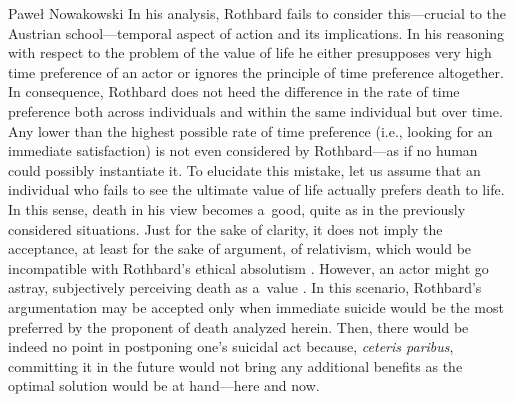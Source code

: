 \begin{artengenv}{Paweł Nowakowski}
In his analysis, Rothbard fails to consider this---crucial to the Austrian school---temporal aspect of action and its implications. In his reasoning with respect to the problem of the value of life he either presupposes very high time preference of an actor or ignores the principle of time preference altogether. In consequence, Rothbard does not heed the difference in the rate of time preference both across individuals and within the same individual but over time. Any lower than the highest possible rate of time preference (i.e., looking for an immediate satisfaction) is not even considered by Rothbard---as if no human could possibly instantiate it. To elucidate this mistake, let us assume that an individual who fails to see the ultimate value of life actually prefers death to life. In this sense, death in his view becomes a~good, quite as in the previously considered situations. Just for the sake of clarity, it does not imply the acceptance, at least for the sake of argument, of relativism, which would be incompatible with Rothbard's ethical absolutism 
\parencite[see][]{Rothbard2008Toward}. %
 However, an actor might go astray, subjectively perceiving death as a~value 
\parencite[cf.][p.252]{Nozick1971On}. %
 In this scenario, Rothbard's argumentation may be accepted only when immediate suicide would be the most preferred by the proponent of death analyzed herein. Then, there would be indeed no point in postponing one's suicidal act because, \textit{ceteris paribus}, committing it in the future would not bring any additional benefits as the optimal solution would be at hand---here and now.




\end{artengenv}
